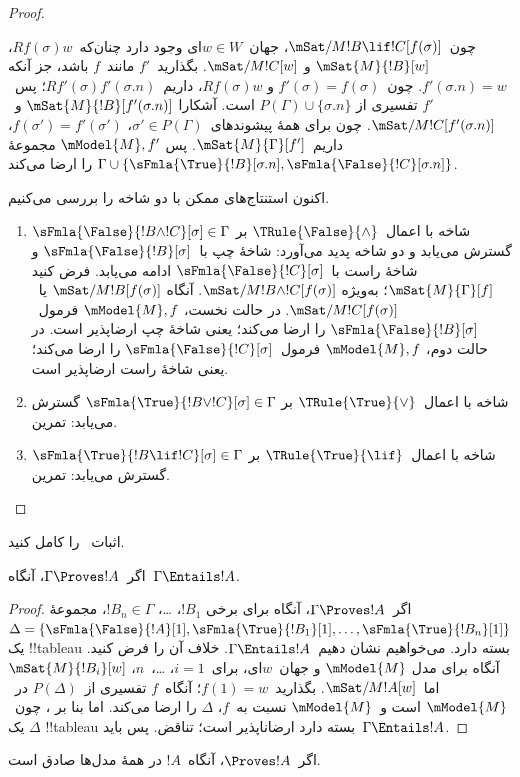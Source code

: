\documentclass[../../../include/open-logic-section]{subfiles}
\begin{document}
\begin{proof}
\begin{enumerate}
  چون~$\mSat/{M}{!B \lif !C}[f(\sigma)]$، جهان~$w \in W$ای وجود دارد
  چنان‌که~$Rf(\sigma)w$، $\mSat{M}{!B}[w]$ و
  $\mSat/{M}{!C}[w]$. بگذارید~$f'$ مانند~$f$ باشد، جز آنکه
  $f'(\sigma.n) = w$. چون~$f'(\sigma) = f(\sigma)$ و
  $Rf(\sigma)w$، داریم~$Rf'(\sigma)f'(\sigma.n)$؛ پس~$f'$ تفسیری از
  $P(\Gamma) \cup \{\sigma.n\}$ است. آشکارا
  $\mSat{M}{!B}[f'(\sigma.n)]$ و~$\mSat/{M}{!C}[f'(\sigma.n)]$.
  چون برای همهٔ پیشوندهای~$\sigma' \in P(\Gamma)$،
  $f(\sigma') = f'(\sigma')$، داریم~$\mSat{M}{\Gamma}[f']$. پس
  $\mModel{M}, f'$ مجموعهٔ
  $\Gamma \cup \{\sFmla{\True}{!B}[\sigma.n],
  \sFmla{\False}{!C}[\sigma.n]\}$ را ارضا می‌کند.
\end{enumerate}
اکنون استنتاج‌های ممکن با دو شاخه را بررسی می‌کنیم.
\begin{enumerate}
\item شاخه با اعمال~$\TRule{\False}{\land}$ بر
  $\sFmla{\False}{!B \land !C}[\sigma] \in \Gamma$ گسترش می‌یابد و دو
  شاخه پدید می‌آورد: شاخهٔ چپ با~$\sFmla{\False}{!B}[\sigma]$ و شاخهٔ
  راست با~$\sFmla{\False}{!C}[\sigma]$ ادامه می‌یابد. فرض کنید
  $\mSat{M}{\Gamma}[f]$؛ به‌ویژه
  $\mSat/{M}{!B \land !C}[f(\sigma)]$. آنگاه
  $\mSat/{M}{!B}[f(\sigma)]$ یا~$\mSat/{M}{!C}[f(\sigma)]$. در حالت
  نخست، $\mModel{M}, f$ فرمول~$\sFmla{\False}{!B}[\sigma]$ را ارضا
  می‌کند؛ یعنی شاخهٔ چپ ارضاپذیر است. در حالت دوم، $\mModel{M}, f$
  فرمول~$\sFmla{\False}{!C}[\sigma]$ را ارضا می‌کند؛ یعنی شاخهٔ راست
  ارضاپذیر است.
\item شاخه با اعمال~$\TRule{\True}{\lor}$ بر
    $\sFmla{\True}{!B \lor !C}[\sigma] \in \Gamma$ گسترش می‌یابد: تمرین.
\item شاخه با اعمال~$\TRule{\True}{\lif}$ بر
    $\sFmla{\True}{!B \lif !C}[\sigma] \in \Gamma$ گسترش می‌یابد: تمرین.
\end{enumerate}
\end{proof}

\begin{prob}
اثبات~ را کامل کنید.
\end{prob}

\begin{cor}
اگر~$\Gamma \Proves !A$، آنگاه~$\Gamma \Entails !A$.
\end{cor}

\begin{proof}
  اگر~$\Gamma \Proves !A$، آنگاه برای برخی
  $!B_1$، \dots، $!B_n \in \Gamma$، مجموعهٔ
  $\Delta = \{\sFmla{\False}{!A}[1], \sFmla{\True}{!B_1}[1],
  \dots, \sFmla{\True}{!B_n}[1]\}$ یک !!{tableau} بسته دارد. می‌خواهیم
  نشان دهیم~$\Gamma \Entails !A$. خلاف آن را فرض کنید. آنگاه برای مدل
  $\mModel{M}$ و جهان~$w$ای، برای~$i=1$، \dots،~$n$،
  $\mSat{M}{!B_i}[w]$ اما~$\mSat/{M}{!A}[w]$. بگذارید~$f(1) = w$؛
  آنگاه~$f$ تفسیری از~$P(\Delta)$ در~$\mModel{M}$ است و~$\mModel{M}$
  نسبت به~$f$، $\Delta$ را ارضا می‌کند. اما بنا بر
  ، چون~$\Delta$ یک !!{tableau} بسته
  دارد ارضاناپذیر است؛ تناقض. پس باید~$\Gamma \Entails !A$.
\end{proof}

\begin{cor}
اگر~$\Proves !A$، آنگاه~$!A$ در همهٔ مدل‌ها صادق است.
\end{cor}
\end{document}

